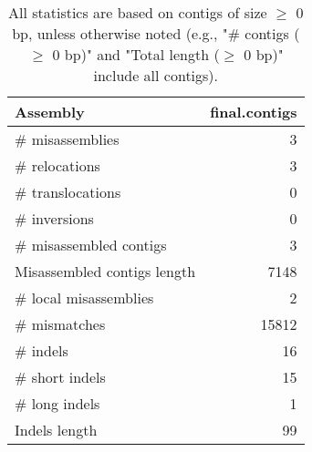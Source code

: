 \documentclass[12pt,a4paper]{article}
\begin{document}
\begin{table}[ht]
\begin{center}
\caption{All statistics are based on contigs of size $\geq$ 0 bp, unless otherwise noted (e.g., "\# contigs ($\geq$ 0 bp)" and "Total length ($\geq$ 0 bp)" include all contigs).}
\begin{tabular}{|l*{1}{|r}|}
\hline
Assembly & final.contigs \\ \hline
\# misassemblies & 3 \\ \hline
\hspace{5mm}\# relocations & 3 \\ \hline
\hspace{5mm}\# translocations & 0 \\ \hline
\hspace{5mm}\# inversions & 0 \\ \hline
\# misassembled contigs & 3 \\ \hline
Misassembled contigs length & 7148 \\ \hline
\# local misassemblies & 2 \\ \hline
\# mismatches & 15812 \\ \hline
\# indels & 16 \\ \hline
\hspace{5mm}\# short indels & 15 \\ \hline
\hspace{5mm}\# long indels & 1 \\ \hline
Indels length & 99 \\ \hline
\end{tabular}
\end{center}
\end{table}
\end{document}
